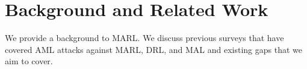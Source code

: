 \documentclass[conference,compsoc]{IEEEtran}
\begin{document}
\section{Background and Related Work}

We provide a background to MARL. We discuss previous surveys that have covered AML attacks against MARL, DRL, and MAL and existing gaps that we aim to cover.





\end{document}
